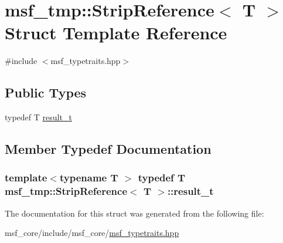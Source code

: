 \hypertarget{structmsf__tmp_1_1StripReference}{\section{msf\-\_\-tmp\-:\-:Strip\-Reference$<$ T $>$ Struct Template Reference}
\label{structmsf__tmp_1_1StripReference}
}


{\ttfamily \#include $<$msf\-\_\-typetraits.\-hpp$>$}

\subsection*{Public Types}
\begin{DoxyCompactItemize}
\item 
typedef T \hyperlink{structmsf__tmp_1_1StripReference_a3e5488373eb6358b4b30fc3386bb50a5}{result\-\_\-t}
\end{DoxyCompactItemize}


\subsection{Member Typedef Documentation}
\hypertarget{structmsf__tmp_1_1StripReference_a3e5488373eb6358b4b30fc3386bb50a5}{
\subsubsection[{result\-\_\-t}]{\setlength{\rightskip}{0pt plus 5cm}template$<$typename T $>$ typedef T {\bf msf\-\_\-tmp\-::\-Strip\-Reference}$<$ T $>$\-::{\bf result\-\_\-t}}}\label{structmsf__tmp_1_1StripReference_a3e5488373eb6358b4b30fc3386bb50a5}


The documentation for this struct was generated from the following file\-:\begin{DoxyCompactItemize}
\item 
msf\-\_\-core/include/msf\-\_\-core/\hyperlink{msf__typetraits_8hpp}{msf\-\_\-typetraits.\-hpp}\end{DoxyCompactItemize}
